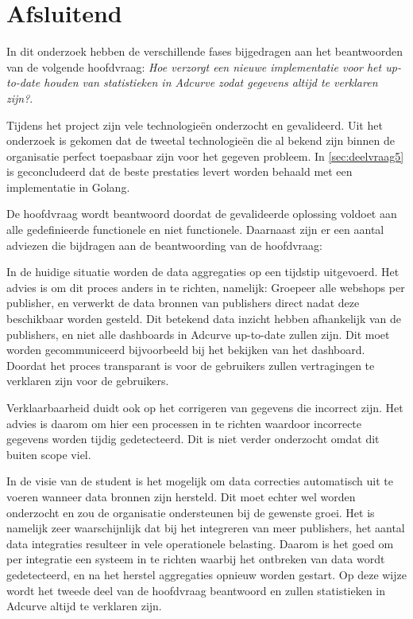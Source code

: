 \chapter{Afsluitend}

In dit onderzoek hebben de verschillende fases bijgedragen aan het beantwoorden van de volgende hoofdvraag: \textit{Hoe verzorgt een nieuwe implementatie voor het up-to-date houden van statistieken in Adcurve zodat gegevens altijd te verklaren zijn?}.

Tijdens het project zijn vele technologieën onderzocht en gevalideerd. Uit het onderzoek is gekomen dat de tweetal technologieën die al bekend zijn binnen de organisatie perfect toepasbaar zijn voor het gegeven probleem. In \ref{sec:deelvraag5} is geconcludeerd dat de beste prestaties levert worden behaald met een implementatie in Golang.

De hoofdvraag wordt beantwoord doordat de gevalideerde oplossing voldoet aan alle gedefinieerde functionele en niet functionele. Daarnaast zijn er een aantal adviezen die bijdragen aan de beantwoording van de hoofdvraag:

In de huidige situatie worden de data aggregaties op een tijdstip uitgevoerd. Het advies is om dit proces anders in te richten, namelijk:
Groepeer alle webshops per publisher, en verwerkt de data bronnen van publishers direct nadat deze beschikbaar worden gesteld. Dit betekend data inzicht hebben afhankelijk van de publishers, en niet alle dashboards in Adcurve up-to-date zullen zijn. Dit moet worden gecommuniceerd bijvoorbeeld bij het bekijken van het dashboard. Doordat het proces transparant is voor de gebruikers zullen vertragingen te verklaren zijn voor de gebruikers.

Verklaarbaarheid duidt ook op het corrigeren van gegevens die incorrect zijn. Het advies is daarom om hier een processen in te richten waardoor incorrecte gegevens worden tijdig gedetecteerd. Dit is niet verder onderzocht omdat dit buiten scope viel.

In de visie van de student is het mogelijk om data correcties automatisch uit te voeren wanneer data bronnen zijn hersteld. Dit moet echter wel worden onderzocht en zou de organisatie ondersteunen bij de gewenste groei. Het is namelijk zeer waarschijnlijk dat bij het integreren van meer publishers, het aantal data integraties resulteer in vele operationele belasting. Daarom is het goed om per integratie een systeem in te richten waarbij het ontbreken van data wordt gedetecteerd, en na het herstel aggregaties opnieuw worden gestart. 
Op deze wijze wordt het tweede deel van de hoofdvraag beantwoord en zullen statistieken in Adcurve altijd te verklaren zijn. 


